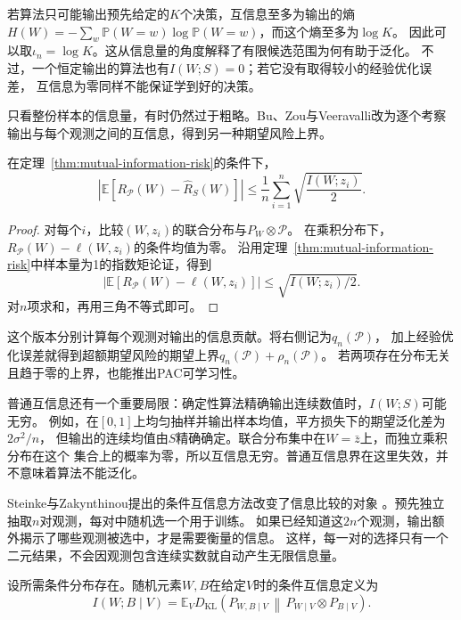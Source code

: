 若算法只可能输出预先给定的$K$个决策，互信息至多为输出的熵
$H(W)=-\sum_w\mathbb P(W=w)\log\mathbb P(W=w)$，而这个熵至多为$\log K$。
因此可以取$\iota_n=\log K$。这从信息量的角度解释了有限候选范围为何有助于泛化。
不过，一个恒定输出的算法也有$I(W;S)=0$；若它没有取得较小的经验优化误差，
互信息为零同样不能保证学到好的决策。

只看整份样本的信息量，有时仍然过于粗略。Bu、Zou与Veeravalli改为逐个考察
输出与每个观测之间的互信息，得到另一种期望风险上界。

\begin{theorem}[逐观测互信息的期望风险界]
\label{thm:individual-information-risk}
在定理~\ref{thm:mutual-information-risk}的条件下，
\[
 \left|\mathbb E[R_{\mathcal P}(W)-\hat R_S(W)]\right|
 \leq\frac1n\sum_{i=1}^n\sqrt{\frac{I(W;z_i)}2}.
\]
\end{theorem}
\begin{proof}
对每个$i$，比较$(W,z_i)$的联合分布与$P_W\otimes\mathcal P$。
在乘积分布下，$R_{\mathcal P}(W)-\ell(W,z_i)$的条件均值为零。
沿用定理~\ref{thm:mutual-information-risk}中样本量为1的指数矩论证，得到
\[
 \left|\mathbb E[R_{\mathcal P}(W)-\ell(W,z_i)]\right|
 \leq\sqrt{I(W;z_i)/2}.
\]
对$n$项求和，再用三角不等式即可。
\end{proof}

这个版本分别计算每个观测对输出的信息贡献。将右侧记为$q_n(\mathcal P)$，
加上经验优化误差就得到超额期望风险的期望上界$q_n(\mathcal P)+\rho_n(\mathcal P)$。
若两项存在分布无关且趋于零的上界，也能推出PAC可学习性。

普通互信息还有一个重要局限：确定性算法精确输出连续数值时，$I(W;S)$可能无穷。
例如，在$[0,1]$上均匀抽样并输出样本均值，平方损失下的期望泛化差为$2\sigma^2/n$，
但输出的连续均值由$S$精确确定。联合分布集中在$W=\bar z$上，而独立乘积分布在这个
集合上的概率为零，所以互信息无穷。普通互信息界在这里失效，并不意味着算法不能泛化。

Steinke与Zakynthinou提出的条件互信息方法改变了信息比较的对象
。预先独立抽取$n$对观测，每对中随机选一个用于训练。
如果已经知道这$2n$个观测，输出额外揭示了哪些观测被选中，才是需要衡量的信息。
这样，每一对的选择只有一个二元结果，不会因观测包含连续实数就自动产生无限信息量。

\begin{definition}[条件互信息]
\label{def:stability-conditional-information}
设所需条件分布存在。随机元素$W,B$在给定$V$时的条件互信息定义为
\[
 I(W;B\mid V)
 =\mathbb E_V D_{\mathrm{KL}}\!\left(
 P_{W,B\mid V}\,\middle\|\,P_{W\mid V}\otimes P_{B\mid V}\right).
\]
\end{definition}

